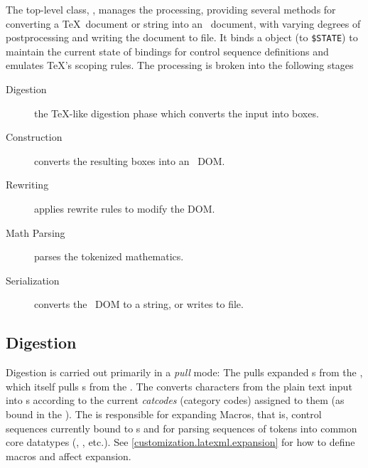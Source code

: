 \documentclass{book}
\newcommand{\ltxcode}{\lstinline[style=latexml]}
\begin{document}
The top-level class, , manages the processing, providing several methods
for converting a \TeX\ document or string into an \XML\ document, with varying degrees
of postprocessing and writing the document to file.
It binds a  object (to \ltxcode|$STATE|) to maintain the current state
of bindings for control sequence definitions and emulates \TeX's scoping rules.
The processing is broken into the following stages
\begin{description}
   \item[Digestion] the \TeX-like digestion phase which converts the input into boxes.
   \item[Construction] converts the resulting boxes into an \XML\ DOM.
   \item[Rewriting] applies rewrite rules to modify the DOM.
   \item[Math Parsing] parses the tokenized mathematics.
   \item[Serialization] converts the \XML\ DOM to a string, or writes to file.
\end{description}

\subsection{Digestion}\label{architecture.digestion}
%
%
%
%
%
%
%
%
%
%
%

Digestion is carried out primarily in a \emph{pull} mode: The 
pulls expanded s from the , which itself pulls s from 
the .  The  converts characters from the plain text input
into s according to the current \emph{catcodes} (category codes) assigned to
them (as bound in the ).  
The  is responsible for expanding Macros,
that is, control sequences currently bound to s
and for parsing sequences of tokens into common core datatypes
(, , etc.).
See \ref{customization.latexml.expansion} for how to define macros
and affect expansion.
\end{document}
